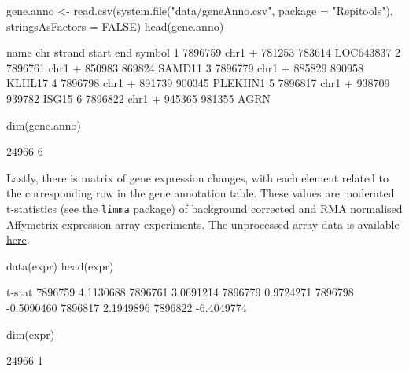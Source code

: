\begin{Schunk}
\begin{Sinput}
 gene.anno <- read.csv(system.file("data/geneAnno.csv", package = "Repitools"),
                       stringsAsFactors = FALSE)
 head(gene.anno)
\end{Sinput}
\begin{Soutput}
     name  chr strand  start    end    symbol
1 7896759 chr1      + 781253 783614 LOC643837
2 7896761 chr1      + 850983 869824    SAMD11
3 7896779 chr1      + 885829 890958    KLHL17
4 7896798 chr1      + 891739 900345   PLEKHN1
5 7896817 chr1      + 938709 939782     ISG15
6 7896822 chr1      + 945365 981355      AGRN
\end{Soutput}
\begin{Sinput}
 dim(gene.anno)
\end{Sinput}
\begin{Soutput}
[1] 24966     6
\end{Soutput}
\end{Schunk}

\noindent Lastly, there is matrix of gene expression changes, with each element related to the corresponding row in the gene annotation table. These values are moderated t-statistics (see the \texttt{limma} package) of background corrected and RMA normalised Affymetrix expression array experiments. The unprocessed array data is available \href{http://www.ncbi.nlm.nih.gov/geo/query/acc.cgi?acc=GSE19726}{here}.

\begin{Schunk}
\begin{Sinput}
 data(expr)
 head(expr)
\end{Sinput}
\begin{Soutput}
            t-stat
7896759  4.1130688
7896761  3.0691214
7896779  0.9724271
7896798 -0.5090460
7896817  2.1949896
7896822 -6.4049774
\end{Soutput}
\begin{Sinput}
 dim(expr)
\end{Sinput}
\begin{Soutput}
[1] 24966     1
\end{Soutput}
\end{Schunk}
